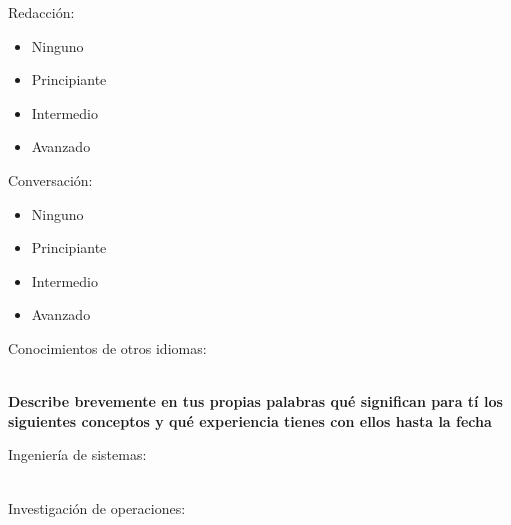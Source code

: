 \documentclass{article}
\begin{document}
\begin{Form}
\begin{multicols}{3}
\columnbreak

Redacción:
\begin{itemize}[itemsep=-2pt]
\item[\raisebox{-4pt}{{\ChoiceMenu[radio,radiosymbol=\ding{52},name=ir]{}{=1}}}]{Ninguno}
\item[\raisebox{-4pt}{{\ChoiceMenu[radio,radiosymbol=\ding{52},name=ir]{}{=2}}}]{Principiante}
\item[\raisebox{-4pt}{{\ChoiceMenu[radio,radiosymbol=\ding{52},name=ir]{}{=3}}}]{Intermedio}
\item[\raisebox{-4pt}{{\ChoiceMenu[radio,radiosymbol=\ding{52},name=ir]{}{=4}}}]{Avanzado}
\end{itemize}

\columnbreak

Conversación:
\begin{itemize}[itemsep=-2pt]
\item[\raisebox{-4pt}{{\ChoiceMenu[radio,radiosymbol=\ding{52},name=ic]{}{=1}}}]{Ninguno}
\item[\raisebox{-4pt}{{\ChoiceMenu[radio,radiosymbol=\ding{52},name=ic]{}{=2}}}]{Principiante}
\item[\raisebox{-4pt}{{\ChoiceMenu[radio,radiosymbol=\ding{52},name=ic]{}{=3}}}]{Intermedio}
\item[\raisebox{-4pt}{{\ChoiceMenu[radio,radiosymbol=\ding{52},name=ic]{}{=4}}}]{Avanzado}
\end{itemize}

\end{multicols}

Conocimientos de otros idiomas: \\  \\
\TextField[name=idiomas,multiline=true,bordercolor=black,align=0,width=\textwidth,height=15em]{}

\newpage

{\bf Describe brevemente en tus propias palabras qué significan para
  tí los siguientes conceptos y qué experiencia tienes con ellos hasta
  la fecha}

Ingeniería de sistemas: \\ \\
\TextField[name=sis,multiline=true,bordercolor=black,align=0,width=\textwidth,height=8em]{}

Investigación de operaciones: \\ \\
\TextField[name=or,multiline=true,bordercolor=black,align=0,width=\textwidth,height=8em]{}


\end{Form}
\end{document}
